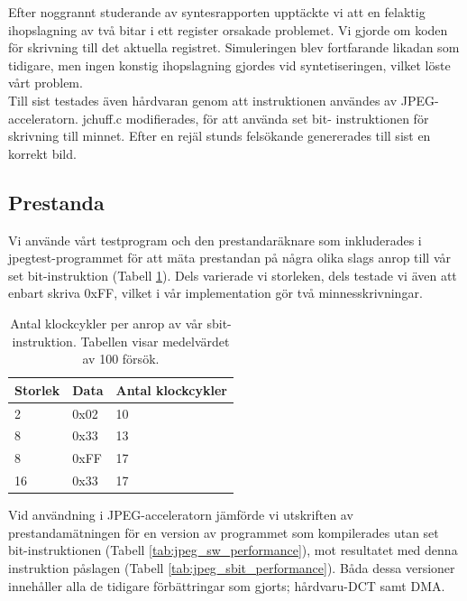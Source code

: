 \documentclass[a4paper]{article}
\begin{document}
Efter noggrannt studerande av syntesrapporten upptäckte vi att en
felaktig ihopslagning av två bitar i ett register orsakade problemet. Vi
gjorde om koden för skrivning till det aktuella registret. Simuleringen
blev fortfarande likadan som tidigare, men ingen konstig ihopslagning
gjordes vid syntetiseringen, vilket löste vårt problem.\\

Till sist testades även hårdvaran genom att instruktionen användes av
JPEG-acceleratorn. jchuff.c modifierades, för att använda set bit-
instruktionen för skrivning till minnet. Efter en rejäl stunds
felsökande genererades till sist en korrekt bild.\\


\subsection{Prestanda}

Vi använde vårt testprogram och den prestandaräknare som inkluderades i
jpegtest-programmet för att mäta prestandan på några olika slags anrop
till vår set bit-instruktion (Tabell \ref{tab:sbit_performance}). Dels
varierade vi storleken, dels testade vi även att enbart skriva 0xFF,
vilket i vår implementation gör två minnesskrivningar.\\

\begin{table}[ht]
    \centering
    \begin{tabular}{l l l}
        Storlek &  Data  &   Antal klockcykler\\
        \hline
        2       &  0x02  &   10\\
        8       &  0x33  &   13\\
        8       &  0xFF  &   17\\
        16      &  0x33  &   17\\
    \end{tabular}
    \caption{ Antal klockcykler per anrop av vår sbit-instruktion. Tabellen visar medelvärdet av 100 försök. }
    \label{tab:sbit_performance}
\end{table}

Vid användning i JPEG-acceleratorn jämförde vi utskriften av
prestandamätningen för en version av programmet som kompilerades utan
set bit-instruktionen (Tabell \ref{tab:jpeg_sw_performance}), mot
resultatet med denna instruktion påslagen (Tabell
\ref{tab:jpeg_sbit_performance}). Båda dessa versioner innehåller alla
de tidigare förbättringar som gjorts; hårdvaru-DCT samt DMA.
\end{document}
